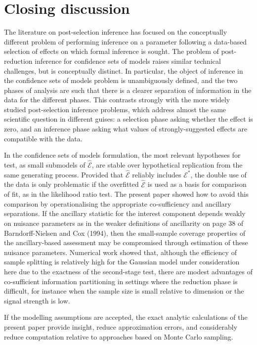 \documentclass[10pt, reqno]{amsart}
\numberwithin{equation}{section}
\begin{document}
\section{Closing discussion}\label{secClosing}

The literature on post-selection inference has focused on the conceptually different problem of performing inference on a parameter following a data-based selection of effects on which formal inference is sought. The problem of post-reduction inference for confidence sets of models raises similar technical challenges, but is conceptually distinct. In particular, the object of inference in the confidence sets of models problem is unambiguously defined, and the two phases of analysis are such that there is a clearer separation of information in the data for the different phases. This contrasts strongly with the more widely studied post-selection inference problems, which address almost the same scientific question in different guises: a selection phase asking whether the effect is zero, and an inference phase asking what values of strongly-suggested effects are compatible with the data. 

In the confidence sets of models formulation, the most relevant hypotheses for test, as small submodels of $\hat{\mathcal{E}}$, are stable over hypothetical replication from the same generating process. Provided that $\hat{\mathcal{E}}$ reliably includes $\mathcal{E}^*$, the double use of the data is only problematic if the overfitted $\hat{\mathcal{E}}$ is used as a basis for comparison of fit, as in the likelihood ratio test. The present paper showed how to avoid this comparison by operationalising the appropriate co-sufficiency and ancillary separations. If the ancillary statistic for the interest component depends weakly on nuisance parameters as in the weaker definitions of ancillarity on page 38 of Barndorff-Nielsen and Cox (1994), then the small-sample coverage properties of the ancillary-based assessment may be compromised through estimation of these nuisance parameters. 
Numerical work showed that, although the efficiency of sample splitting is relatively high for the Gaussian model under consideration here due to the exactness of the second-stage test, there are modest advantages of co-sufficient information partitioning in settings where the reduction phase is difficult, for instance when the sample size is small relative to dimension or the signal strength is low.

If the modelling assumptions are accepted, the exact analytic calculations of the present paper provide insight, reduce approximation errors, and considerably reduce computation relative to approaches based on Monte Carlo sampling.
\end{document}
